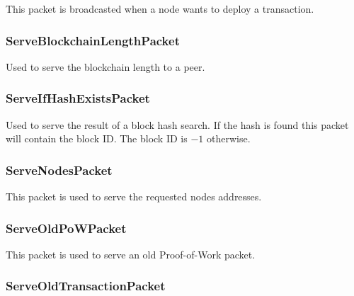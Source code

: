 \documentclass[../documentation.tex]{subfiles}
\begin{document}
This packet is broadcasted when a node wants to deploy a transaction.


\subsubsection{ServeBlockchainLengthPacket}

Used to serve the blockchain length to a peer.


\subsubsection{ServeIfHashExistsPacket}

Used to serve the result of a block hash search.
If the hash is found this packet will contain the block ID.
The block ID is \(-1\) otherwise.


\subsubsection{ServeNodesPacket}

This packet is used to serve the requested nodes addresses.


\subsubsection{ServeOldPoWPacket}

This packet is used to serve an old Proof-of-Work packet.


\subsubsection{ServeOldTransactionPacket}
\end{document}
